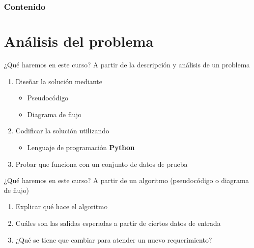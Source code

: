 \begin{frame}
    \frametitle{Contenido}
    \tableofcontents
\end{frame}

\section{Análisis del problema}

\begin{frame}[c]{¿Qué haremos en este curso?}
  A partir de la descripción y análisis de un problema
  \pausa
  \begin{enumerate}
    \item Diseñar la solución mediante
      \begin{itemize}
        \item Pseudocódigo
        \item Diagrama de flujo
      \end{itemize}
    \pausa
    \item Codificar la solución utilizando
      \begin{itemize}
        \item Lenguaje de programación \textbf{Python}
      \end{itemize}
    \pausa
    \item Probar que funciona con un conjunto de datos de prueba
  \end{enumerate}
\end{frame}

\begin{frame}[c]{¿Qué haremos en este curso?}
  A partir de un algoritmo (pseudocódigo o diagrama de flujo)
  \begin{enumerate}
    \item Explicar qué hace el algoritmo
    \pausa
    \item Cuáles son las salidas esperadas a partir de ciertos datos de
      entrada
    \pausa
    \item ¿Qué se tiene que cambiar para atender un nuevo requerimiento?
  \end{enumerate}
\end{frame}

